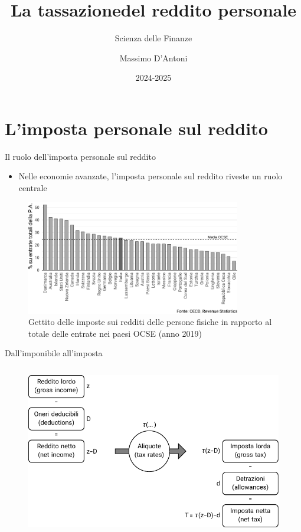 \documentclass[aspectratio=64,12pt]{beamer}
\institute{Università di Siena}
\author{Massimo D'Antoni}
\date{2024-2025}
\title{La tassazione\newline del reddito personale}
\subtitle{Scienza delle Finanze}
\newcommand\€{\,\text{€}}
\begin{document}
\maketitle

\section{L'imposta personale sul reddito}

\begin{frame}{Il ruolo dell'imposta personale sul reddito}
\begin{itemize}
\item Nelle economie avanzate, l'imposta personale sul reddito riveste un ruolo
centrale
\end{itemize}

\begin{figure}
\centering
\includegraphics[height=5cm]{./figure/gettito-imposta-personale-OCSE.pdf}
\caption{Gettito delle imposte sui redditi delle persone fisiche in rapporto al totale delle entrate nei paesi OCSE (anno 2019)}
\end{figure}
\end{frame}

\begin{frame}{Dall'imponibile all'imposta}
\begin{figure}
\centering
\includegraphics[height=7.5cm]{./figure/da-reddito-a-imposta.pdf}
\end{figure}
\end{frame}
\end{document}
